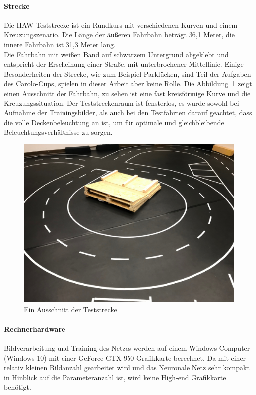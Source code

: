 \paragraph{Strecke}
Die HAW Teststrecke ist ein Rundkurs mit verschiedenen Kurven und einem Kreuzungszenario. Die Länge der äußeren Fahrbahn beträgt 36,1 Meter, die innere Fahrbahn ist 31,3 Meter lang.\\
Die Fahrbahn mit weißen Band auf schwarzem Untergrund abgeklebt und entspricht der Erscheinung einer Straße, mit unterbrochener Mittellinie. Einige Besonderheiten der Strecke, wie zum Beispiel Parklücken, sind Teil der Aufgaben des Carolo-Cups, spielen in dieser Arbeit aber keine Rolle.
Die Abbildung~\ref{img:teststrecke} zeigt einen Ausschnitt der Fahrbahn, zu sehen ist eine fast kreisförmige Kurve und die Kreuzungssituation. 
Der Teststreckenraum ist fensterlos, es wurde sowohl bei Aufnahme der Trainingsbilder, als auch bei den Testfahrten darauf geachtet, dass die volle Deckenbeleuchtung an ist, um für optimale und gleichbleibende Beleuchtungsverhältnisse zu sorgen.

\begin{figure}[h]
	\centering
	\includegraphics[scale=0.15]{figures/Teststrecke-Ausschnitt.jpg}
	\caption{Ein Ausschnitt der Teststrecke}
	\label{img:teststrecke}
\end{figure}
\paragraph{Rechnerhardware}
Bildverarbeitung und Training des Netzes werden auf einem Windows Computer (Windows 10) mit einer GeForce GTX 950 Grafikkarte berechnet. Da mit einer relativ kleinen Bildanzahl gearbeitet wird und das Neuronale Netz sehr kompakt in Hinblick auf die Parameteranzahl ist, wird keine High-end Grafikkarte benötigt.



